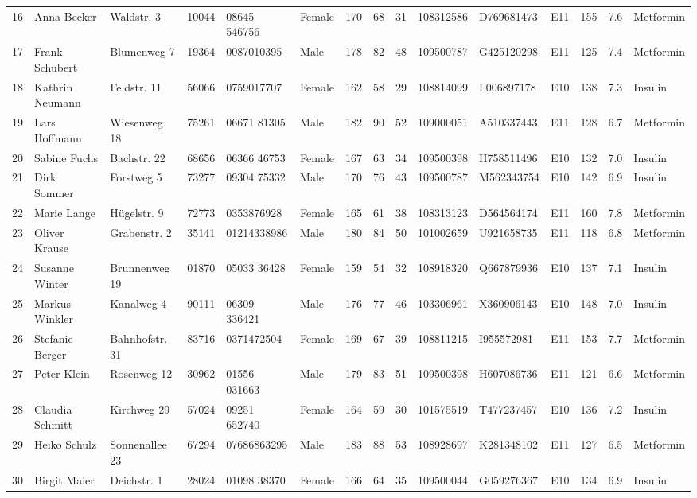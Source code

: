 \begin{table}
\begin{longtable}{lllllllllllllll}
    16 & Anna Becker & Waldstr. 3 & 10044 & 08645 546756 & Female & 170 & 68 & 31 & 108312586 & D769681473 & E11 & 155 & 7.6 & Metformin \\
    17 & Frank Schubert & Blumenweg 7 & 19364 & 0087010395 & Male & 178 & 82 & 48 & 109500787 & G425120298 & E11 & 125 & 7.4 & Metformin \\
    18 & Kathrin Neumann & Feldstr. 11 & 56066 & 0759017707 & Female & 162 & 58 & 29 & 108814099 & L006897178 & E10 & 138 & 7.3 & Insulin \\
    19 & Lars Hoffmann & Wiesenweg 18 & 75261 & 06671 81305 & Male & 182 & 90 & 52 & 109000051 & A510337443 & E11 & 128 & 6.7 & Metformin \\
    20 & Sabine Fuchs & Bachstr. 22 & 68656 & 06366 46753 & Female & 167 & 63 & 34 & 109500398 & H758511496 & E10 & 132 & 7.0 & Insulin \\
    21 & Dirk Sommer & Forstweg 5 & 73277 & 09304 75332 & Male & 170 & 76 & 43 & 109500787 & M562343754 & E10 & 142 & 6.9 & Insulin \\
    22 & Marie Lange & Hügelstr. 9 & 72773 & 0353876928 & Female & 165 & 61 & 38 & 108313123 & D564564174 & E11 & 160 & 7.8 & Metformin \\
    23 & Oliver Krause & Grabenstr. 2 & 35141 & 01214338986 & Male & 180 & 84 & 50 & 101002659 & U921658735 & E11 & 118 & 6.8 & Metformin \\
    24 & Susanne Winter & Brunnenweg 19 & 01870 & 05033 36428 & Female & 159 & 54 & 32 & 108918320 & Q667879936 & E10 & 137 & 7.1 & Insulin \\
    25 & Markus Winkler & Kanalweg 4 & 90111 & 06309 336421 & Male & 176 & 77 & 46 & 103306961 & X360906143 & E10 & 148 & 7.0 & Insulin \\
    26 & Stefanie Berger & Bahnhofstr. 31 & 83716 & 0371472504 & Female & 169 & 67 & 39 & 108811215 & I955572981 & E11 & 153 & 7.7 & Metformin \\
    27 & Peter Klein & Rosenweg 12 & 30962 & 01556 031663 & Male & 179 & 83 & 51 & 109500398 & H607086736 & E11 & 121 & 6.6 & Metformin \\
    28 & Claudia Schmitt & Kirchweg 29 & 57024 & 09251 652740 & Female & 164 & 59 & 30 & 101575519 & T477237457 & E10 & 136 & 7.2 & Insulin \\
    29 & Heiko Schulz & Sonnenallee 23 & 67294 & 07686863295 & Male & 183 & 88 & 53 & 108928697 & K281348102 & E11 & 127 & 6.5 & Metformin \\
    30 & Birgit Maier & Deichstr. 1 & 28024 & 01098 38370 & Female & 166 & 64 & 35 & 109500044 & G059276367 & E10 & 134 & 6.9 & Insulin \\

\end{longtable}
\end{table}
